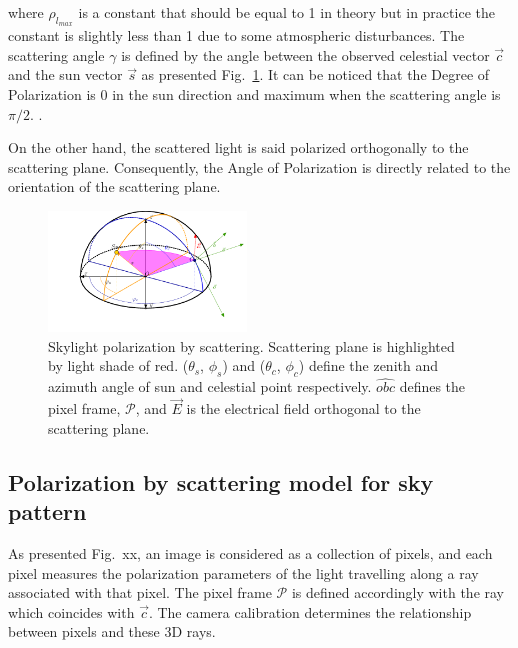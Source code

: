 where $\rho_{l_{max}}$ is a constant that should be equal to 1 in theory but in practice
the constant is slightly less than 1 due to some atmospheric disturbances\cite{pomozi2001clearsky}.
The scattering angle $\gamma$ is defined by the angle between the observed celestial vector $\vec{c}$ and the sun 
vector $\vec{s}$ as presented Fig.~\ref{fig:scattering}. It can be noticed that
the Degree of Polarization is 0 in the sun direction and maximum when the scattering angle is $\pi/2$.
\cite{smith2007polarization, miyazaki09sunlightpolarization}.

On the other hand, the scattered light is said polarized orthogonally to the scattering plane.
Consequently, the Angle of Polarization is directly related to the orientation of the scattering plane.

\begin{figure}
  \centering
  \includegraphics[width=0.47\textwidth]{./content/intro/figures/polasky-iros.pdf}
  \caption{Skylight polarization by scattering. Scattering plane is highlighted
  by light shade of red. ($\theta_s$, $\phi_s$) and ($\theta_c$, $\phi_c$)
  define the zenith and azimuth angle of sun and celestial point
  respectively. $\widehat{obc}$ defines the pixel frame, $\mathcal{P}$, and
  $\vec{E}$ is the electrical field orthogonal to the scattering plane.}
    \label{fig:scattering}
\end{figure}


\subsection{Polarization by scattering model for sky pattern}
\label{subsec:pscattering}
As presented Fig.~xx, an image is considered as a collection of pixels, and each pixel measures the polarization 
parameters of the light travelling along a ray associated with that pixel. The pixel frame $\mathcal{P}$ is defined 
accordingly with the ray which coincides with $\vec{c}$. The camera calibration determines the relationship between 
pixels and these 3D rays.


